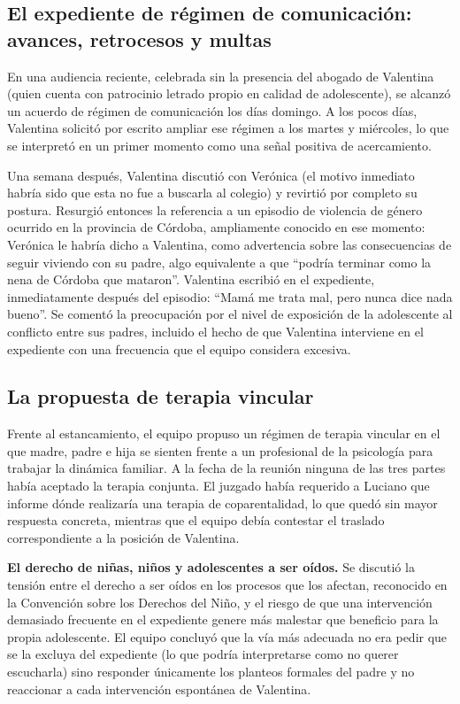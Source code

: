 \documentclass[12pt,oneside]{book}
\begin{document}
\subsection{El expediente de régimen de comunicación: avances, retrocesos y multas}

En una audiencia reciente, celebrada sin la presencia del abogado de Valentina (quien cuenta con patrocinio letrado propio en calidad de adolescente), se alcanzó un acuerdo de régimen de comunicación los días domingo. A los pocos días, Valentina solicitó por escrito ampliar ese régimen a los martes y miércoles, lo que se interpretó en un primer momento como una señal positiva de acercamiento.

Una semana después, Valentina discutió con Verónica (el motivo inmediato habría sido que esta no fue a buscarla al colegio) y revirtió por completo su postura. Resurgió entonces la referencia a un episodio de violencia de género ocurrido en la provincia de Córdoba, ampliamente conocido en ese momento: Verónica le habría dicho a Valentina, como advertencia sobre las consecuencias de seguir viviendo con su padre, algo equivalente a que ``podría terminar como la nena de Córdoba que mataron''. Valentina escribió en el expediente, inmediatamente después del episodio: ``Mamá me trata mal, pero nunca dice nada bueno''. Se comentó la preocupación por el nivel de exposición de la adolescente al conflicto entre sus padres, incluido el hecho de que Valentina interviene en el expediente con una frecuencia que el equipo considera excesiva.

\subsection{La propuesta de terapia vincular}

Frente al estancamiento, el equipo propuso un régimen de terapia vincular en el que madre, padre e hija se sienten frente a un profesional de la psicología para trabajar la dinámica familiar. A la fecha de la reunión ninguna de las tres partes había aceptado la terapia conjunta. El juzgado había requerido a Luciano que informe dónde realizaría una terapia de coparentalidad, lo que quedó sin mayor respuesta concreta, mientras que el equipo debía contestar el traslado correspondiente a la posición de Valentina.

\begin{important}
\textbf{El derecho de niñas, niños y adolescentes a ser oídos.} Se discutió la tensión entre el derecho a ser oídos en los procesos que los afectan, reconocido en la Convención sobre los Derechos del Niño, y el riesgo de que una intervención demasiado frecuente en el expediente genere más malestar que beneficio para la propia adolescente. El equipo concluyó que la vía más adecuada no era pedir que se la excluya del expediente (lo que podría interpretarse como no querer escucharla) sino responder únicamente los planteos formales del padre y no reaccionar a cada intervención espontánea de Valentina.
\end{important}
\end{document}

